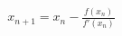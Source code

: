 \documentclass[preview]{standalone}
\begin{document}
\begin{align*}
x_{n+1} = x_n - \frac{f(x_n)}{f'(x_n)}
\end{align*}
\end{document}
